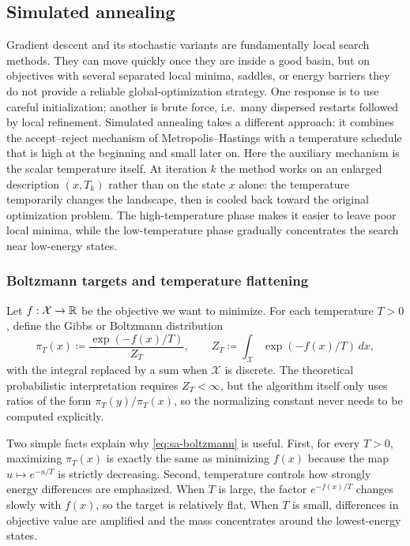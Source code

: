 \subsection{Simulated annealing}
\label{subsec:simulated-annealing}

Gradient descent and its stochastic variants are fundamentally local search methods.
They can move quickly once they are inside a good basin, but on objectives with several separated local minima, saddles, or energy barriers they do not provide a reliable global-optimization strategy.
One response is to use careful initialization; another is brute force, i.e.\ many dispersed restarts followed by local refinement.
Simulated annealing takes a different approach:
it combines the accept--reject mechanism of Metropolis--Hastings with a temperature schedule that is high at the beginning and small later on.
Here the auxiliary mechanism is the scalar temperature itself.
At iteration $k$ the method works on an enlarged description $(x,T_k)$ rather than on the state $x$ alone: the temperature temporarily changes the landscape, then is cooled back toward the original optimization problem.
The high-temperature phase makes it easier to leave poor local minima, while the low-temperature phase gradually concentrates the search near low-energy states.

\subsubsection{Boltzmann targets and temperature flattening}
\label{subsubsec:sa-tempered-targets}

Let $f:\mathcal{X}\to\mathbb{R}$ be the objective we want to minimize.
For each temperature $T>0$, define the Gibbs or Boltzmann distribution
\begin{equation}
  \pi_T(x)
  \coloneqq
  \frac{\exp(-f(x)/T)}{Z_T},
  \qquad
  Z_T \coloneqq \int_{\mathcal{X}} \exp(-f(x)/T)\,dx,
  \label{eq:sa-boltzmann}
\end{equation}
with the integral replaced by a sum when $\mathcal{X}$ is discrete.
The theoretical probabilistic interpretation requires $Z_T<\infty$, but the algorithm itself only uses ratios of the form $\pi_T(y)/\pi_T(x)$, so the normalizing constant never needs to be computed explicitly.

Two simple facts explain why \eqref{eq:sa-boltzmann} is useful.
First, for every $T>0$, maximizing $\pi_T(x)$ is exactly the same as minimizing $f(x)$ because the map $u\mapsto e^{-u/T}$ is strictly decreasing.
Second, temperature controls how strongly energy differences are emphasized.
When $T$ is large, the factor $e^{-f(x)/T}$ changes slowly with $f(x)$, so the target is relatively flat.
When $T$ is small, differences in objective value are amplified and the mass concentrates around the lowest-energy states.

